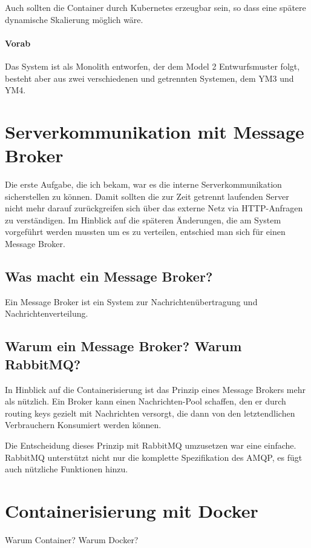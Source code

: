 \documentclass[12pt,a4paper]{article}
\begin{document}
Auch sollten die Container durch \gls{Kubernetes} erzeugbar sein, so dass eine spätere dynamische Skalierung möglich wäre.

\paragraph{Vorab}
Das System ist als Monolith entworfen, der dem Model 2 Entwurfsmuster folgt, besteht aber aus zwei verschiedenen und getrennten Systemen, dem YM3 und YM4. 


\section{Serverkommunikation mit Message Broker} \label{rabbit}
Die erste Aufgabe, die ich bekam, war es die interne Serverkommunikation sicherstellen zu können. Damit sollten die zur Zeit getrennt laufenden Server nicht mehr darauf zurückgreifen sich über das externe Netz via \gls{HTTP}-Anfragen zu verständigen. Im Hinblick auf die späteren Änderungen, die am System vorgeführt werden mussten um es zu verteilen, entschied man sich für einen Message Broker.

\subsection{Was macht ein Message Broker?}
Ein Message Broker ist ein System zur Nachrichtenübertragung und Nachrichtenverteilung.

\subsection{Warum ein Message Broker? Warum RabbitMQ?}
In Hinblick auf die Containerisierung ist das Prinzip eines Message Brokers mehr als nützlich.
Ein Broker kann einen Nachrichten-Pool schaffen, den er durch routing keys gezielt mit Nachrichten versorgt, die dann von den letztendlichen Verbrauchern Konsumiert werden können.

Die Entscheidung dieses Prinzip mit RabbitMQ umzusetzen war eine einfache. RabbitMQ unterstützt nicht nur die komplette Spezifikation des \gls{AMQP}, es fügt auch nützliche Funktionen hinzu\cite{rabEx}.

\section{Containerisierung mit \gls{Docker}} \label{docker}
Warum Container? Warum Docker?
\end{document}
